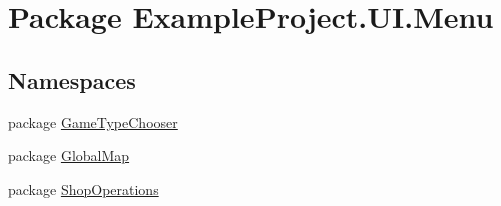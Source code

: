\hypertarget{namespace_example_project_1_1_u_i_1_1_menu}{}\section{Package Example\+Project.\+U\+I.\+Menu}
\label{namespace_example_project_1_1_u_i_1_1_menu}
\subsection*{Namespaces}
\begin{DoxyCompactItemize}
\item 
package \hyperlink{namespace_example_project_1_1_u_i_1_1_menu_1_1_game_type_chooser}{Game\+Type\+Chooser}
\item 
package \hyperlink{namespace_example_project_1_1_u_i_1_1_menu_1_1_global_map}{Global\+Map}
\item 
package \hyperlink{namespace_example_project_1_1_u_i_1_1_menu_1_1_shop_operations}{Shop\+Operations}
\end{DoxyCompactItemize}
